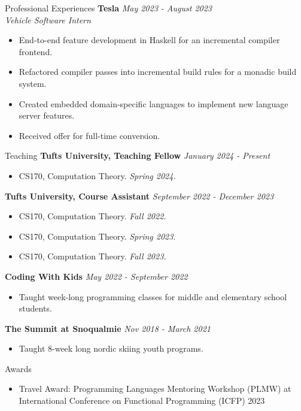 \documentclass{resume} %
\begin{document}
\begin{rSection}{Professional Experiences}
{\bf Tesla} \hfill {\em May 2023 - August 2023}\\
\hfill {\it Vehicle Software Intern}
\begin{itemize}
    \item End-to-end feature development in Haskell for an incremental compiler frontend.
    \item Refactored compiler passes into incremental build rules for a monadic build system.
    \item Created embedded domain-specific languages to implement new language server features.
    \item Received offer for full-time conversion.
\end{itemize}
\end{rSection}

\begin{rSection}{Teaching}
{\bf Tufts University, Teaching Fellow} \hfill {\em January 2024 - Present}
\begin{itemize}
    \item CS170, Computation Theory. {\it Spring 2024.}
\end{itemize}

{\bf Tufts University, Course Assistant} \hfill {\em September 2022 - December 2023}
\begin{itemize}
    \item CS170, Computation Theory. {\it Fall 2022.}
    \item CS170, Computation Theory. {\it Spring 2023.}
    \item CS170, Computation Theory. {\it Fall 2023.}
\end{itemize}

{\bf Coding With Kids} \hfill {\em May 2022 - September 2022}
\begin{itemize}
    \item Taught week-long programming classes for middle and elementary school students.
\end{itemize}

{\bf The Summit at Snoqualmie} \hfill {\em Nov 2018 - March 2021}
\begin{itemize}
    \item Taught 8-week long nordic skiing youth programs.
\end{itemize}
    
\end{rSection}

\begin{rSection}{Awards}
    \begin{itemize}
        \item Travel Award: Programming Languages Mentoring Workshop (PLMW) at International Conference on Functional Programming (ICFP) 2023
    \end{itemize}
\end{rSection}
\end{document}
